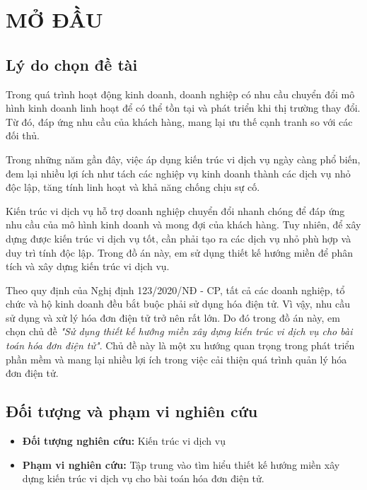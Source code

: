 \chapter*{\centering MỞ ĐẦU}


\section*{Lý do chọn đề tài}

 


Trong quá trình hoạt động kinh doanh, doanh nghiệp có nhu cầu chuyển đổi mô hình kinh doanh linh hoạt để có thể tồn tại và phát triển khi thị trường thay đổi. Từ đó, đáp ứng nhu cầu của khách hàng, mang lại ưu thế cạnh tranh so với các đối thủ.

Trong những năm gần đây, việc áp dụng kiến trúc vi dịch vụ ngày càng phổ biến, đem lại nhiều lợi ích như tách các nghiệp vụ kinh doanh thành các dịch vụ nhỏ độc lập, tăng tính linh hoạt và khả năng chống chịu sự cố.

Kiến trúc vi dịch vụ hỗ trợ doanh nghiệp chuyển đổi nhanh chóng để đáp ứng nhu cầu của mô hình kinh doanh và mong đợi của khách hàng. Tuy nhiên, để xây dựng được kiến trúc vi dịch vụ tốt, cần phải tạo ra các dịch vụ nhỏ phù hợp và duy trì tính độc lập. Trong đồ án này, em sử dụng thiết kế hướng miền để phân tích và xây dựng kiến trúc vi dịch vụ.

Theo quy định của Nghị định 123/2020/NĐ - CP, tất cả các doanh nghiệp, tổ chức và hộ kinh doanh đều bắt buộc phải sử dụng hóa điện tử. Vì vậy, nhu cầu sử dụng và xử lý hóa đơn điện tử trở nên rất lớn. Do đó trong đồ án này, em chọn chủ đề \emph{"Sử dụng thiết kế hướng miền xây dựng kiến trúc vi dịch vụ cho bài toán hóa đơn điện tử"}. Chủ đề này là một xu hướng quan trọng trong phát triển phần mềm và mang lại nhiều lợi ích trong việc cải thiện quá trình quản lý hóa đơn điện tử.



\section*{Đối tượng và phạm vi nghiên cứu}


\begin{itemize}

\item \textbf{Đối tượng nghiên cứu:} Kiến trúc vi dịch vụ

\item \textbf{Phạm vi nghiên cứu:} Tập trung vào tìm hiểu thiết kế hướng miền xây dựng kiến trúc vi dịch vụ cho bài toán hóa đơn điện tử.

\end{itemize}

